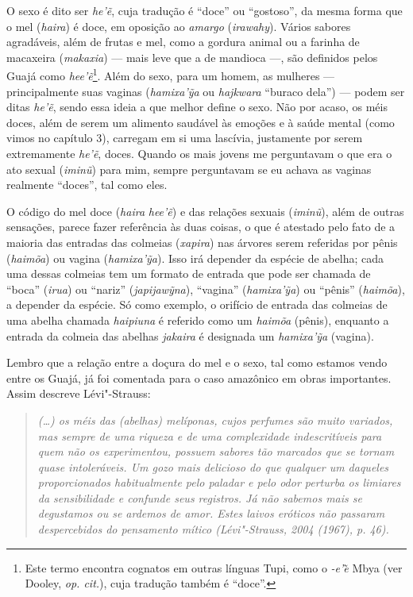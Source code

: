 O sexo é dito ser \emph{he'ẽ}, cuja tradução é ``doce'' ou ``gostoso'', da
mesma forma que o mel (\emph{haira}) é doce, em oposição ao
\emph{amargo} (\emph{irawahy}). Vários sabores agradáveis, além de
frutas e mel, como a gordura animal ou a farinha de macaxeira
(\emph{makaxia}) --- mais leve que a de mandioca ---, são definidos pelos
Guajá como \emph{hee'ẽ}\footnote{Este termo encontra cognatos em outras
  línguas Tupi, como o \emph{-e'e}̃ Mbya (ver Dooley, \emph{op. cit.}), cuja
  tradução também é ``doce''.}. Além do sexo, para um homem, as mulheres ---
principalmente suas vaginas (\emph{hamixa'ỹa} ou \emph{hajkwara}
``buraco dela'') --- podem ser ditas \emph{he'ẽ}, sendo essa ideia a que
melhor define o sexo. Não por acaso, os méis doces, além de serem um
alimento saudável às emoções e à saúde mental (como vimos no capítulo
3), carregam em si uma lascívia, justamente por serem extremamente
\emph{he'ẽ}, doces. Quando os mais jovens me perguntavam o que era o ato
sexual (\emph{iminũ}) para mim, sempre perguntavam se eu achava as
vaginas realmente ``doces'', tal como eles.

O código do mel doce (\emph{haira} \emph{hee'ẽ}) e das relações sexuais
(\emph{iminũ}), além de outras sensações, parece fazer referência às
duas coisas, o que é atestado pelo fato de a maioria das entradas das
colmeias (\emph{xapira}) nas árvores serem referidas por pênis
(\emph{haimõa}) ou vagina (\emph{hamixa'ỹa}). Isso irá depender da
espécie de abelha; cada uma dessas colmeias tem um formato de entrada
que pode ser chamada de ``boca'' (\emph{irua}) ou ``nariz''
(\emph{japijawỹna}), ``vagina'' (\emph{hamixa'ỹa}) ou ``pênis''
(\emph{haimõa}), a depender da espécie. Só como exemplo, o orifício de
entrada das colmeias de uma abelha chamada \emph{haipiuna} é referido
como um \emph{haimõa} (pênis), enquanto a entrada da colmeia das abelhas
\emph{jakaira} é designada um \emph{hamixa'ỹa} (vagina).

Lembro que a relação entre a doçura do mel e o sexo, tal como estamos
vendo entre os Guajá, já foi comentada para o caso amazônico em obras
importantes. Assim descreve Lévi"-Strauss:

\begin{quote}
\emph{(\ldots{}) os méis das (abelhas) melíponas, cujos perfumes são muito
variados, mas sempre de uma riqueza e de uma complexidade indescritíveis
para quem não os experimentou, possuem sabores tão marcados que se
tornam quase intoleráveis. Um gozo mais delicioso do que qualquer um
daqueles proporcionados habitualmente pelo paladar e pelo odor perturba
os limiares da sensibilidade e confunde seus registros. Já não sabemos
mais se degustamos ou se ardemos de amor. Estes laivos eróticos não
passaram despercebidos do pensamento mítico (Lévi"-Strauss, 2004 (1967),
p. 46).}
\end{quote}

